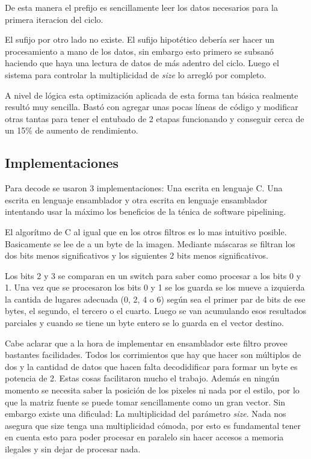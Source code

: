 	De esta manera el prefijo es sencillamente leer los datos necesarios para la primera iteracion
del ciclo.


	El sufijo por otro lado no existe. El sufijo hipotético debería ser hacer un procesamiento
a mano de los datos, sin embargo esto primero se subsanó haciendo que haya una lectura de datos de más
adentro del ciclo. Luego el sistema para controlar la multiplicidad de \textit{size} lo arregló
por completo.

	A nivel de lógica esta optimización aplicada de esta forma tan básica realmente resultó
muy sencilla. Bastó con agregar unas pocas líneas de código y modificar otras
tantas para tener el entubado de 2 etapas funcionando y conseguir cerca de un 15\% de aumento
de rendimiento.


\subsection{Implementaciones}


	Para decode se usaron 3 implementaciones: Una escrita en lenguaje C.
Una escrita en lenguaje ensamblador y otra escrita en lenguaje ensamblador
intentando usar la máximo los beneficios de la ténica de software pipelining.

	El algorítmo de C al igual que en los otros filtros es lo mas intuitivo posible.
Basicamente se lee de a un byte de la imagen. Mediante máscaras se filtran los dos bits
menos significativos y los siguientes 2 bits menos significativos.

	Los bits 2 y 3 se comparan en un switch para saber como procesar
a los bits 0 y 1. Una vez que se procesaron los bits 0 y 1 se los guarda se los
mueve a izquierda la cantida de lugares adecuada (0, 2, 4 o 6) según sea el primer
par de bits de ese bytes, el segundo, el tercero o el cuarto. Luego se van acumulando
esos resultados parciales y cuando se tiene un byte entero se lo guarda en el vector
destino.

	Cabe aclarar que a la hora de implementar en ensamblador este filtro provee bastantes
facilidades. Todos los corrimientos que hay que hacer son múltiplos de dos y la cantidad
de datos que hacen falta decodidificar para formar un byte es potencia de 2. Estas
cosas facilitaron mucho el trabajo. Además en ningún momento se necesita saber la
posición de los pixeles ni nada por el estilo, por lo que la matriz fuente se puede
tomar sencillamente como un gran vector. Sin embargo existe una dificulad: La
multiplicidad del parámetro \textit{size}. Nada nos asegura que size tenga una
multiplicidad cómoda, por esto es fundamental tener en cuenta esto para poder
procesar en paralelo sin hacer accesos a memoria ilegales y sin dejar de procesar nada.

